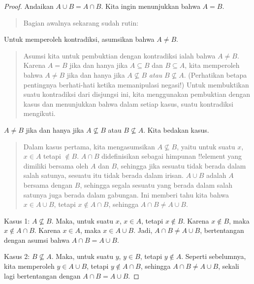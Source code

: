 \documentclass[../../../include/open-logic-section]{subfiles}
\begin{document}
\begin{proof}
  Andaikan $A \cup B = A \cap B$. Kita ingin menunjukkan bahwa $A = B$.
  \begin{quote}
    Bagian awalnya sekarang sudah rutin:
  \end{quote}
  Untuk memperoleh kontradiksi, asumsikan bahwa $A \neq B$.
  \begin{quote}
    Asumsi kita untuk pembuktian dengan kontradiksi ialah bahwa $A
    \neq B$. Karena $A = B$ jika dan hanya jika $A \subseteq B$ dan
    $B \subseteq A$, kita memperoleh bahwa $A \neq B$ jika dan hanya
    jika $A \nsubseteq B$ \emph{atau} $B \nsubseteq A$. (Perhatikan
    betapa pentingnya berhati-hati ketika memanipulasi negasi!{}) Untuk
    membuktikan suatu kontradiksi dari disjungsi ini, kita menggunakan
    pembuktian dengan kasus dan menunjukkan bahwa dalam setiap kasus,
    suatu kontradiksi mengikuti.
  \end{quote}
  $A \neq B$ jika dan hanya jika $A \nsubseteq B$ atau $B \nsubseteq
  A$. Kita bedakan kasus.
  \begin{quote}
    Dalam kasus pertama, kita mengasumsikan $A \nsubseteq B$, yaitu
    untuk suatu $x$, $x \in A$ tetapi $\notin B$. $A \cap B$
    didefinisikan sebagai himpunan !!{element} yang dimiliki bersama
    oleh $A$ dan $B$, sehingga jika sesuatu tidak berada dalam salah
    satunya, sesuatu itu tidak berada dalam irisan. $A \cup B$ adalah
    $A$ bersama dengan $B$, sehingga segala sesuatu yang berada dalam
    salah satunya juga berada dalam gabungan. Ini memberi tahu kita
    bahwa $x \in A \cup B$, tetapi $x \notin A \cap B$, sehingga $A
    \cap B \neq A \cup B$.
  \end{quote}

  Kasus 1: $A \nsubseteq B$. Maka, untuk suatu $x$, $x \in A$, tetapi
  $x \notin B$. Karena $x \notin B$, maka $x \notin A \cap B$. Karena
  $x \in A$, maka $x \in A \cup B$. Jadi, $A \cap B \neq A \cup B$,
  bertentangan dengan asumsi bahwa $A \cap B = A \cup B$.

  Kasus 2: $B \nsubseteq A$. Maka, untuk suatu $y$, $y \in B$, tetapi
  $y \notin A$. Seperti sebelumnya, kita memperoleh $y \in A \cup B$,
  tetapi $y \notin A \cap B$, sehingga $A \cap B \neq A \cup B$,
  sekali lagi bertentangan dengan $A \cap B = A \cup B$.
\end{proof}
\end{document}
